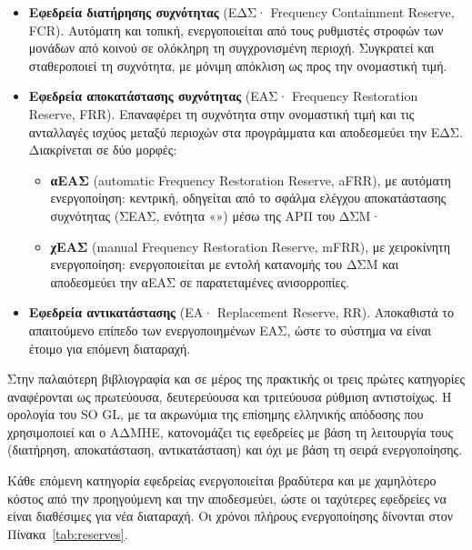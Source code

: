 \begin{itemize}
\item \textbf{Εφεδρεία διατήρησης συχνότητας} (ΕΔΣ· Frequency Containment Reserve, FCR).
      Αυτόματη και τοπική, ενεργοποιείται από τους ρυθμιστές στροφών των μονάδων από κοινού σε
      ολόκληρη τη συγχρονισμένη περιοχή. Συγκρατεί και σταθεροποιεί τη συχνότητα, με μόνιμη
      απόκλιση ως προς την ονομαστική τιμή.
\item \textbf{Εφεδρεία αποκατάστασης συχνότητας} (ΕΑΣ· Frequency Restoration Reserve, FRR).
      Επαναφέρει τη συχνότητα στην ονομαστική τιμή και τις ανταλλαγές ισχύος μεταξύ περιοχών
      στα προγράμματα και αποδεσμεύει την ΕΔΣ. Διακρίνεται σε δύο μορφές:
      \begin{itemize}
      \item \textbf{αΕΑΣ} (automatic Frequency Restoration Reserve, aFRR), με αυτόματη ενεργοποίηση: κεντρική, οδηγείται από το σφάλμα
            ελέγχου αποκατάστασης συχνότητας (ΣΕΑΣ, ενότητα «») μέσω της ΑΡΠ του
            ΔΣΜ·
      \item \textbf{χΕΑΣ} (manual Frequency Restoration Reserve, mFRR), με χειροκίνητη ενεργοποίηση: ενεργοποιείται με εντολή
            κατανομής του ΔΣΜ και αποδεσμεύει την αΕΑΣ σε παρατεταμένες ανισορροπίες.
      \end{itemize}
\item \textbf{Εφεδρεία αντικατάστασης} (ΕΑ· Replacement Reserve, RR). Αποκαθιστά το απαιτούμενο
      επίπεδο των ενεργοποιημένων ΕΑΣ, ώστε το σύστημα να είναι έτοιμο για επόμενη διαταραχή.
\end{itemize}

Στην παλαιότερη βιβλιογραφία και σε μέρος της πρακτικής οι τρεις πρώτες κατηγορίες
αναφέρονται ως πρωτεύουσα, δευτερεύουσα και τριτεύουσα ρύθμιση αντιστοίχως. Η ορολογία του
SO GL, με τα ακρωνύμια της επίσημης ελληνικής απόδοσης που χρησιμοποιεί και ο ΑΔΜΗΕ,
κατονομάζει τις εφεδρείες με βάση τη λειτουργία τους (διατήρηση, αποκατάσταση,
αντικατάσταση) και όχι με βάση τη σειρά ενεργοποίησης.

Κάθε επόμενη κατηγορία εφεδρείας ενεργοποιείται βραδύτερα και με χαμηλότερο κόστος από την
προηγούμενη και την αποδεσμεύει, ώστε οι ταχύτερες εφεδρείες να είναι διαθέσιμες για νέα
διαταραχή. Οι χρόνοι πλήρους ενεργοποίησης δίνονται στον Πίνακα~\ref{tab:reserves}.

